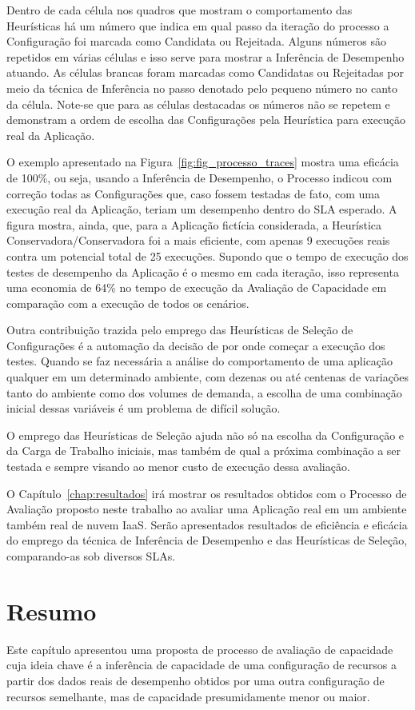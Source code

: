 Dentro de cada célula nos quadros que mostram o comportamento das Heurísticas há
um número que indica em qual passo da iteração do processo a Configuração foi
marcada como Candidata ou Rejeitada. Alguns números são repetidos em várias células
e isso serve para mostrar a Inferência de Desempenho atuando. As células brancas
foram marcadas como Candidatas ou Rejeitadas por meio da técnica de Inferência no
passo denotado pelo pequeno número no canto da célula. Note-se que para as células 
destacadas os números não se repetem e demonstram a ordem de escolha das Configurações
pela Heurística para execução real da Aplicação.

O exemplo apresentado na Figura~\ref{fig:fig_processo_traces} mostra uma eficácia
de 100\%, ou seja, usando a Inferência de Desempenho, o Processo indicou com correção todas as
Configurações que, caso fossem testadas de fato, com uma execução real da Aplicação,
teriam um desempenho dentro do SLA esperado. A figura mostra, ainda, que, para a 
Aplicação fictícia considerada, a Heurística Conservadora/Conservadora foi a mais
eficiente, com apenas 9 execuções reais contra um potencial total de 25 execuções.
Supondo que o tempo de execução dos testes de desempenho da Aplicação é o mesmo 
em cada iteração, isso representa uma economia de 64\% no tempo de execução da
Avaliação de Capacidade em comparação com a execução de todos os cenários.

Outra contribuição trazida pelo emprego das Heurísticas de Seleção de
Configurações é a automação da decisão de por onde começar a execução dos testes. Quando se faz
necessária a análise do comportamento de uma aplicação qualquer em um determinado
ambiente, com dezenas ou até centenas de variações tanto do ambiente como dos 
volumes de demanda, a escolha de uma combinação inicial dessas variáveis é um
problema de difícil solução.

O emprego das Heurísticas de Seleção ajuda não só na escolha da Configuração e 
da Carga de Trabalho iniciais, mas também de qual a próxima combinação a ser 
testada e sempre visando ao menor custo de execução dessa avaliação.

O Capítulo~\ref{chap:resultados} irá mostrar os resultados obtidos
com o Processo de Avaliação proposto neste trabalho ao avaliar uma
Aplicação real em um ambiente também real de nuvem IaaS. Serão apresentados
resultados de eficiência e eficácia do emprego da técnica de Inferência de Desempenho
e das Heurísticas de Seleção, comparando-as sob diversos SLAs.

\section{Resumo}
Este capítulo apresentou uma proposta de processo de avaliação de capacidade
cuja ideia chave é a inferência de capacidade de uma configuração de recursos a partir dos dados 
reais de desempenho obtidos por uma outra configuração de recursos semelhante, mas de capacidade
presumidamente menor ou maior.


